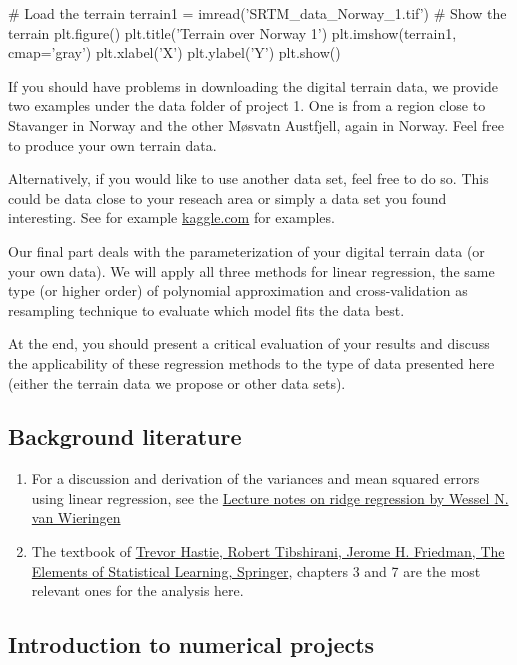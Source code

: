 \documentclass[%
oneside,                 %
final,                   %
10pt]{article}
\begin{document}
# Load the terrain
terrain1 = imread('SRTM_data_Norway_1.tif')
# Show the terrain
plt.figure()
plt.title('Terrain over Norway 1')
plt.imshow(terrain1, cmap='gray')
plt.xlabel('X')
plt.ylabel('Y')
plt.show()
\epycod

If you should have problems in downloading the digital terrain data,
we provide two examples under the data folder of project 1. One is
from a region close to Stavanger in Norway and the other Møsvatn
Austfjell, again in Norway.
Feel free to produce your own terrain data.


Alternatively, if you would like to use another data set, feel free to do so. This could be data close to your reseach area or simply a data set you found interesting. See for example \href{{https://www.kaggle.com/datasets}}{kaggle.com} for examples.


Our final part deals with the parameterization of your digital terrain
data (or your own data).  We will apply all three methods for linear regression, the same type (or higher order) of polynomial
approximation and cross-validation as resampling technique to evaluate which
model fits the data best.

At the end, you should present a critical evaluation of your results
and discuss the applicability of these regression methods to the type
of data presented here (either the terrain data we propose or other data sets).




\subsection{Background literature}

\begin{enumerate}
\item For a discussion and derivation of the variances and mean squared errors using linear regression, see the \href{{https://arxiv.org/abs/1509.09169}}{Lecture notes on ridge regression by Wessel N. van Wieringen}

\item The textbook of \href{{https://www.springer.com/gp/book/9780387848570}}{Trevor Hastie, Robert Tibshirani, Jerome H. Friedman, The Elements of Statistical Learning, Springer}, chapters 3 and 7 are the most relevant ones for the analysis here. 
\end{enumerate}

\noindent
\subsection{Introduction to numerical projects}
\end{document}
